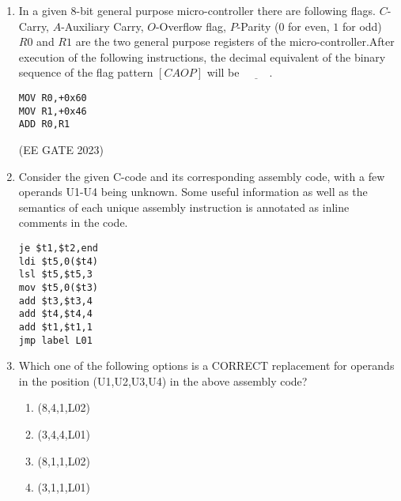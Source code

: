 \begin{enumerate}
\item In a given $8$-bit general purpose micro-controller there are following flags. $C$-Carry, $A$-Auxiliary Carry, $O$-Overflow flag, $P$-Parity ($0$ for even, $1$ for odd) $R0$ and $R1$ are the two general purpose registers of the micro-controller.After execution of the following instructions, the decimal equivalent of the binary sequence of the flag pattern $[CAOP]$ will be $\underline{\hspace{1cm}}$.\\


\begin{lstlisting}
MOV R0,+0x60
MOV R1,+0x46 
ADD R0,R1
\end{lstlisting}
    
\hfill{(EE GATE 2023)}\\


\item 
Consider the given C-code and its corresponding assembly code, with a few operands U1-U4 being unknown. Some useful information as well as the semantics of each unique assembly instruction is annotated as inline comments in the code.  

\begin{lstlisting}
je $t1,$t2,end
ldi $t5,0($t4)
lsl $t5,$t5,3
mov $t5,0($t3)
add $t3,$t3,4
add $t4,$t4,4
add $t1,$t1,1
jmp label L01
\end{lstlisting}

\item Which one of the following options is a CORRECT replacement 
for operands in the position (U1,U2,U3,U4) in the above 
assembly code?

\begin{enumerate}
\item (8,4,1,L02)                      
\item (3,4,4,L01)
\item (8,1,1,L02)                             
\item (3,1,1,L01)         
\end{enumerate}

\end{enumerate}
